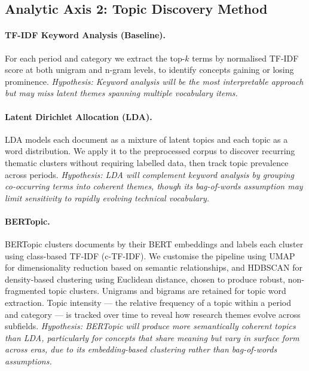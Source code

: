 \documentclass{article}
\begin{document}
\subsection{Analytic Axis 2: Topic Discovery Method}
\label{subsec:comparison}

\paragraph{TF-IDF Keyword Analysis (Baseline).}
For each period and category we extract the top-$k$ terms
by normalised TF-IDF score at both unigram and n-gram
levels, to identify concepts gaining or losing prominence.
\textit{Hypothesis: Keyword analysis will be the most
interpretable approach but may miss latent themes spanning
multiple vocabulary items.}

\paragraph{Latent Dirichlet Allocation (LDA).}
LDA \citep{blei2003latent} models each document as a mixture
of latent topics and each topic as a word distribution.
We apply it to the preprocessed corpus to discover recurring
thematic clusters without requiring labelled data, then
track topic prevalence across periods.
\textit{Hypothesis: LDA will complement keyword analysis
by grouping co-occurring terms into coherent themes, though
its bag-of-words assumption may limit sensitivity to rapidly
evolving technical vocabulary.}

\paragraph{BERTopic.}
BERTopic \citep{grootendorst2022bertopic} clusters documents
by their BERT embeddings and labels each cluster using
class-based TF-IDF (c-TF-IDF). We customise the pipeline
using UMAP \citep{mcinnes2018umap} for dimensionality
reduction based on semantic relationships, and HDBSCAN
\citep{campello2013hdbscan} for density-based clustering
using Euclidean distance, chosen to produce robust,
non-fragmented topic clusters. Unigrams and bigrams are
retained for topic word extraction. Topic intensity ---
the relative frequency of a topic within a period and
category --- is tracked over time to reveal how research
themes evolve across subfields.
\textit{Hypothesis: BERTopic will produce more semantically
coherent topics than LDA, particularly for concepts that
share meaning but vary in surface form across eras, due
to its embedding-based clustering rather than bag-of-words
assumptions.}
\end{document}
